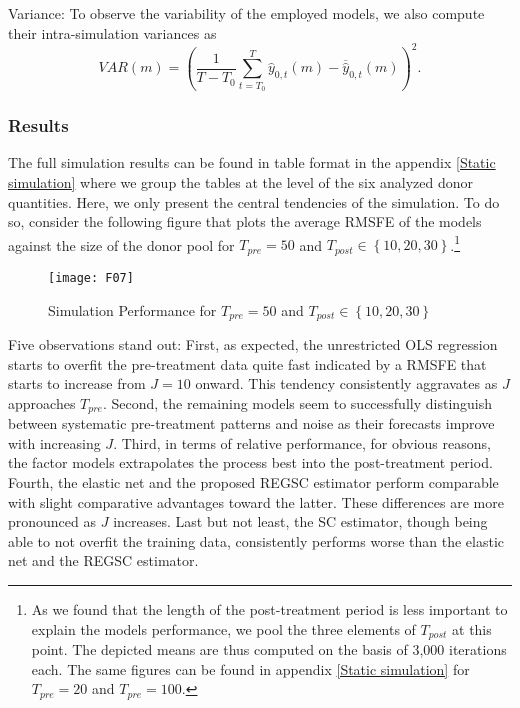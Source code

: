Variance: To observe the variability of the employed models, we also compute their intra-simulation variances as
$$VAR(m) = \left(\frac{1}{T - T_0} \sum_{t = T_0}^{T} \widehat{y}_{0,t}(m) - \overline{\widehat{y}}_{0,t}(m) \right) ^2. $$


\subsubsection{Results}
The full simulation results can be found in table format in the appendix \ref{Static simulation} where we group the tables at the level of the six analyzed donor quantities. Here, we only present the central tendencies of the simulation. To do so, consider the following figure that plots the average \ac{RMSFE} of the models against the size of the donor pool for $T_{pre} = 50$ and $T_{post} \in \left\lbrace 10,20,30\right\rbrace$.\footnote{As we found that the length of the post-treatment period is less important to explain the models performance, we pool the three elements of $T_{post}$ at this point. The depicted means are thus computed on the basis of 3,000 iterations each. The same figures can be found in appendix \ref{Static simulation} for $T_{pre} = 20$ and $T_{pre} = 100$.} 



\begin{figure}[H]
	\centering
	\texttt{[image: F07]}
	\caption{Simulation Performance for $T_{pre} = 50$ and $T_{post} \in \left\lbrace 10,20,30\right\rbrace$}
	\label{F_07}
\end{figure}

Five observations stand out: First, as expected, the unrestricted \ac{OLS} regression starts to overfit the pre-treatment data quite fast indicated by a \ac{RMSFE} that starts to increase from $J = 10$ onward. This tendency consistently aggravates as $J$ approaches $T_{pre}$. Second, the remaining models seem to successfully distinguish between systematic pre-treatment patterns and noise as their forecasts improve with increasing $J$. Third, in terms of relative performance, for obvious reasons, the factor models extrapolates the process best into the post-treatment period. Fourth, the elastic net and the proposed \ac{REGSC} estimator perform comparable with slight comparative advantages toward the latter. These differences are more pronounced as $J$ increases. Last but not least, the \ac{SC} estimator, though being able to not overfit the training data, consistently performs worse than the elastic net and the \ac{REGSC} estimator. 

